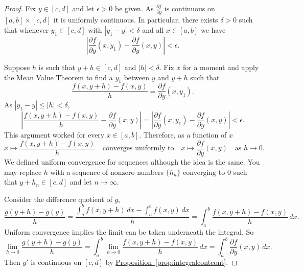\documentclass[12pt,openany]{book}
\newcommand{\abs}[1]{\left\lvert {#1} \right\rvert}
\theoremstyle{plain}
\theoremstyle{remark}
\theoremstyle{definition}
\theoremstyle{exercise}
\theoremstyle{example}
\newcommand{\propref}[1]{\hyperref[#1]{Proposition~\ref*{#1}}}
\begin{document}
\begin{proof}
Fix $y \in [c,d]$ and let $\epsilon > 0$ be given.
As $\frac{\partial f}{\partial y}$ is continuous on $[a,b] \times [c,d]$ it
is uniformly continuous.  In particular, there exists $\delta > 0$ such that
whenever $y_1 \in [c,d]$ with
$\abs{y_1-y} < \delta$ and all $x \in [a,b]$ we have
\begin{equation*}
\abs{\frac{\partial f}{\partial y}(x,y_1)-\frac{\partial f}{\partial y}(x,y)} < \epsilon .
\end{equation*}

Suppose $h$ is such that $y+h \in [c,d]$ and $\abs{h} < \delta$.
Fix $x$ for a moment
and apply the Mean Value Theorem to find a $y_1$ between $y$ and $y+h$ such that
\begin{equation*}
\frac{f(x,y+h)-f(x,y)}{h}
=
\frac{\partial f}{\partial y}(x,y_1) .
\end{equation*}
As $\abs{y_1-y} \leq \abs{h} < \delta$,
\begin{equation*}
\abs{
\frac{f(x,y+h)-f(x,y)}{h}
-
\frac{\partial f}{\partial y}(x,y) 
}
=
\abs{
\frac{\partial f}{\partial y}(x,y_1) 
-
\frac{\partial f}{\partial y}(x,y) 
}
< \epsilon .
\end{equation*}
This argument worked for every $x \in [a,b]$.  Therefore, as a function of
$x$
\begin{equation*}
x \mapsto \frac{f(x,y+h)-f(x,y)}{h}
\quad
\text{converges uniformly to}
\quad
x \mapsto \frac{\partial f}{\partial y}(x,y)
\quad
\text{as $h \to 0$} .
\end{equation*}
We defined uniform convergence for sequences although the idea is the
same.  You may replace $h$ with a sequence of nonzero 
numbers $\{ h_n \}$
converging to $0$ such that $y+h_n \in [c,d]$ and let $n \to \infty$.

Consider the difference quotient of $g$,
\begin{equation*}
\frac{g(y+h)-g(y)}{h}
=
\frac{\int_a^b f(x,y+h) \,dx -
\int_a^b f(x,y) \,dx }{h}
=
\int_a^b \frac{f(x,y+h)-f(x,y)}{h} \,dx .
\end{equation*}
Uniform convergence implies the limit can be taken underneath the integral.
So
\begin{equation*}
\lim_{h\to 0}
\frac{g(y+h)-g(y)}{h}
= 
\int_a^b 
\lim_{h\to 0}
\frac{f(x,y+h)-f(x,y)}{h} \,dx 
=
\int_a^b 
\frac{\partial f}{\partial y}(x,y) \,dx .
\end{equation*}
Then $g'$ is continuous on $[c,d]$ by
\propref{prop:integralcontcont}.
\end{proof}
\end{document}
